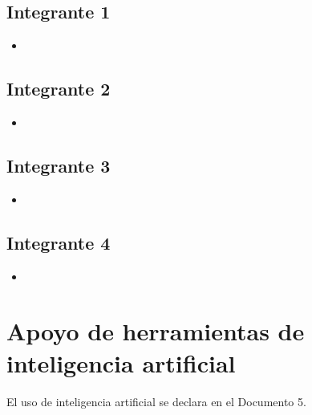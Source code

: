 \documentclass[12pt,a4paper]{article}
\begin{document}
\subsection*{Integrante 1}
\begin{itemize}
  \item {}
\end{itemize}

\subsection*{Integrante 2}
\begin{itemize}
  \item {}
\end{itemize}

\subsection*{Integrante 3}
\begin{itemize}
  \item {}
\end{itemize}

\subsection*{Integrante 4}
\begin{itemize}
  \item {}
\end{itemize}

\section{Apoyo de herramientas de inteligencia artificial}

El uso de inteligencia artificial se declara en el Documento 5.
\end{document}
